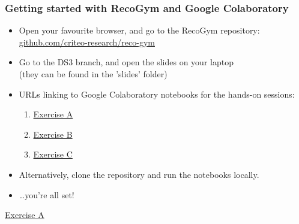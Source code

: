 \begin{frame}
  \frametitle{Getting started with RecoGym and Google Colaboratory}
  \begin{itemize}
    \item Open your favourite browser, and go to the RecoGym repository: \url{github.com/criteo-research/reco-gym}\vspace{3mm}
    \item Go to the DS3 branch, and open the slides on your laptop\\(they can be found in the 'slides' folder)\vspace{3mm}
    \item  URLs linking to Google Colaboratory notebooks for the hands-on sessions:
        \begin{enumerate}
            \item \href{https://colab.research.google.com/github/criteo-research/reco-gym/blob/DS3/Module\%20III\%20A.ipynb}{Exercise A}
            \item \href{https://colab.research.google.com/github/criteo-research/reco-gym/blob/DS3/Module\%20III\%20B.ipynb}{Exercise B}
            \item \href{https://colab.research.google.com/github/criteo-research/reco-gym/blob/DS3/Module\%20III\%20C.ipynb}{Exercise C}
        \end{enumerate}
    \item Alternatively, clone the repository and run the notebooks locally.\vspace{3mm}
    \item \ldots you're all set!
  \end{itemize}
\end{frame}



\begin{frame}
  \href{https://colab.research.google.com/github/criteo-research/reco-gym/blob/DS3/Module\%20III\%20A.ipynb}{Exercise A}
\end{frame}